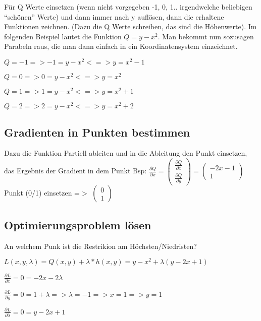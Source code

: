\documentclass[a4paper, 11pt]{article}
\begin{document}
Für Q Werte einsetzen (wenn nicht vorgegeben -1, 0, 1.. irgendwelche beliebigen
``schönen'' Werte) und dann immer nach y auflösen, dann die erhaltene Funktionen
zeichnen. (Dazu die Q Werte schreiben, das sind die Höhenwerte). Im folgenden
Beispiel lautet die Funktion $Q = y - x^2$. Man bekommt nun sozusagen Parabeln
raus, die man dann einfach in ein Koordinatensystem einzeichnet. \newline

$Q = -1 => -1 = y - x^2 <=> y = x^2 -1$

$Q = 0 => 0 = y - x^2 <=> y = x^2$

$Q = 1 => 1 = y - x^2 <=> y = x^2 +1$

$Q = 2 => 2 = y - x^2 <=> y = x^2 +2$


\subsection{Gradienten in Punkten bestimmen}

Dazu die Funktion Partiell ableiten und in die Ableitung den Punkt einsetzen,
das Ergebnis der Gradient in dem Punkt \newline
Bsp: $\frac{\partial Q}{\partial x} = 
\begin{pmatrix}
	\frac{\partial Q}{\partial x} \\
	\frac{\partial Q}{\partial y}
\end{pmatrix}
=  
\begin{pmatrix} 
	-2x-1 \\
	1
\end{pmatrix}$ \newline
\newline
Punkt (0/1) einsetzen =$>$ 
$\begin{pmatrix}
	0\\
	1
\end{pmatrix}$ 

\subsection{Optimierungsproblem lösen}

An welchem Punk ist die Restrikion am Höchsten/Niedristen? \newline

$L(x,y,\lambda) = Q(x,y) + \lambda * h(x,y) = y-x^2+\lambda(y-2x+1)$ \newline

\begin{compactenum}[(1)] 
\item $\frac{\partial L}{\partial x} = 0 = -2x-2\lambda$ 
\item $\frac{\partial L}{\partial y} = 0 = 1 + \lambda => \lambda = -1 => x = 1
	=> y = 1$
\item $\frac{\partial L}{\partial \lambda} = 0 = y-2x+1$ \newline
\end{compactenum}
\end{document}
